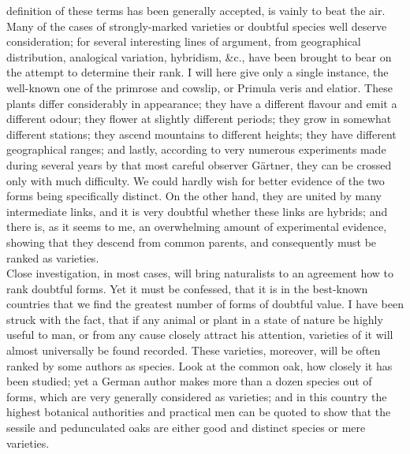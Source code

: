 definition of these terms has been generally accepted, is vainly to beat the air. \\
\indent Many of the cases of strongly-marked varieties or doubtful species well deserve consideration; for several interesting lines of argument, from geographical distribution, analogical variation, hybridism, \&c., have been brought to bear on the attempt to determine their rank.  I will here give only a single instance, the well-known one of the primrose and cowslip, or Primula veris and elatior. These plants differ considerably in appearance; they have a different flavour and emit a different odour; they flower at slightly different periods; they grow in somewhat different stations; they ascend mountains to different heights; they have different geographical ranges; and lastly, according to very numerous experiments made during several years by that most careful observer G\"{a}rtner, they can be crossed only with much difficulty. We could hardly wish for better evidence of the two forms being specifically distinct. On the other hand, they are united by many intermediate links, and it is very doubtful whether these links are hybrids; and there is, as it seems to me, an overwhelming amount of experimental evidence, showing that they descend from common parents, and consequently must be ranked as varieties. \\
\indent Close investigation, in most cases, will bring naturalists to an agreement how to rank doubtful forms. Yet it must be confessed, that it is in the best-known countries that we find the greatest number of forms of doubtful value.  I have been struck with the fact, that if any animal or plant in a state of nature be highly useful to man, or from any cause closely attract his attention, varieties of it will almost universally be found recorded. These varieties, moreover, will be often ranked by some authors as species.  Look at the common oak, how closely it has been studied; yet a German author makes more than a dozen species out of forms, which are very generally considered as varieties; and in this country the highest botanical authorities and practical men can be quoted to show that the sessile and pedunculated oaks are either good and distinct species or mere varieties. \\
